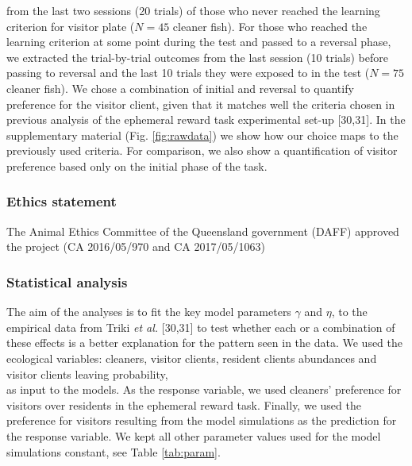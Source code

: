 \documentclass[10pt,letterpaper]{article}
\begin{document}
from the last two sessions (20 trials) of those who never reached the
learning criterion for visitor plate (\(N = 45\) cleaner fish). For
those who reached the learning criterion at some point during the test
and passed to a reversal phase, we extracted the trial-by-trial outcomes
from the last session (10 trials) before passing to reversal and the
last 10 trials they were exposed to in the test (\(N = 75\) cleaner
fish). We chose a combination of initial and reversal to quantify
preference for the visitor client, given that it matches well the
criteria chosen in previous analysis of the ephemeral reward task
experimental set-up {[}30,31{]}. In the supplementary material (Fig.
\ref{fig:rawdata}) we show how our choice maps to the previously used
criteria. For comparison, we also show a quantification of visitor
preference based only on the initial phase of the task.

\hypertarget{ethics-statement}{%
\subsubsection{Ethics statement}\label{ethics-statement}}

The Animal Ethics Committee of the Queensland government (DAFF) approved
the project (CA 2016/05/970 and CA 2017/05/1063)

\hypertarget{statistical-analysis}{%
\subsubsection{Statistical analysis}\label{statistical-analysis}}

The aim of the analyses is to fit the key model parameters \(\gamma\)
and \(\eta\), to the empirical data from Triki \emph{et al.} {[}30,31{]}
to test whether each or a combination of these effects is a better
explanation for the pattern seen in the data. We used the ecological
variables: cleaners, visitor clients, resident clients abundances and
visitor clients leaving probability,\\
as input to the models. As the response variable, we used cleaners'
preference for visitors over residents in the ephemeral reward task.
Finally, we used the preference for visitors resulting from the model
simulations as the prediction for the response variable. We kept all
other parameter values used for the model simulations constant, see
Table \ref{tab:param}.
\end{document}
